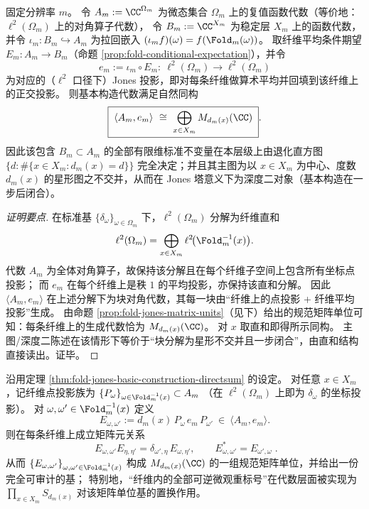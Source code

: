 \begin{theorem}\label{thm:fold-jones-basic-construction-directsum}
固定分辨率 \(m\)。
令
\(
A_m:=\CC^{\Omega_m}
\)
为微态集合 \(\Omega_m\) 上的复值函数代数（等价地：\(\ell^2(\Omega_m)\) 上的对角算子代数），
令
\(
B_m:=\CC^{X_m}
\)
为稳定层 \(X_m\) 上的函数代数，并令 \(\iota_m:B_m\hookrightarrow A_m\) 为拉回嵌入 \((\iota_m f)(\omega)=f(\Fold_m(\omega))\)。
取纤维平均条件期望 \(E_m:A_m\to B_m\)（命题 \ref{prop:fold-conditional-expectation}），并令
\[
e_m:=\iota_m\circ E_m:\ \ell^2(\Omega_m)\to \ell^2(\Omega_m)
\]
为对应的（\(\ell^2\) 口径下）Jones 投影，即对每条纤维做算术平均并回填到该纤维上的正交投影。
则基本构造代数满足自然同构
\[
\boxed{\;
\langle A_m,e_m\rangle
\ \cong\
\bigoplus_{x\in X_m} M_{d_m(x)}(\CC)\; }.
\]
因此该包含 \(B_m\subset A_m\) 的全部有限维标准不变量在本层级上由退化直方图
\(
\{d:\#\{x\in X_m:d_m(x)=d\}\}
\)
完全决定；并且其主图为以 \(x\in X_m\) 为中心、度数 \(d_m(x)\) 的星形图之不交并，从而在 Jones 塔意义下为深度二对象（基本构造在一步后闭合）。
\end{theorem}

\begin{proof}[证明要点]
在标准基 \(\{\delta_\omega\}_{\omega\in\Omega_m}\) 下，\(\ell^2(\Omega_m)\) 分解为纤维直和
\[
\ell^2(\Omega_m)=\bigoplus_{x\in X_m}\ell^2\!\bigl(\Fold_m^{-1}(x)\bigr).
\]
代数 \(A_m\) 为全体对角算子，故保持该分解且在每个纤维子空间上包含所有坐标点投影；
而 \(e_m\) 在每个纤维上是秩 \(1\) 的平均投影，亦保持该直和分解。
因此 \(\langle A_m,e_m\rangle\) 在上述分解下为块对角代数，其每一块由“纤维上的点投影 + 纤维平均投影”生成。
由命题 \ref{prop:fold-jones-matrix-units}（见下）给出的规范矩阵单位可知：每条纤维上的生成代数恰为 \(M_{d_m(x)}(\CC)\)。
对 \(x\) 取直和即得所示同构。
主图/深度二陈述在该情形下等价于“块分解为星形不交并且一步闭合”，由直和结构直接读出。证毕。
\end{proof}

\begin{proposition}\label{prop:fold-jones-matrix-units}
\leanverified{paper\_fold\_jones\_matrix\_units}
沿用定理 \ref{thm:fold-jones-basic-construction-directsum} 的设定。
对任意 \(x\in X_m\)，记纤维点投影族为
\(
\{P_\omega\}_{\omega\in \Fold_m^{-1}(x)}\subset A_m
\)
（在 \(\ell^2(\Omega_m)\) 上即为 \(\delta_\omega\) 的坐标投影）。
对 \(\omega,\omega'\in \Fold_m^{-1}(x)\) 定义
\[
E_{\omega,\omega'}:=d_m(x)\,P_\omega\,e_m\,P_{\omega'}\ \in\ \langle A_m,e_m\rangle.
\]
则在每条纤维上成立矩阵元关系
\[
\boxed{\;
E_{\omega,\omega'}E_{\eta,\eta'}=\delta_{\omega',\eta}\,E_{\omega,\eta'},
\qquad
E_{\omega,\omega'}^{\ast}=E_{\omega',\omega}\; }.
\]
从而 \(\{E_{\omega,\omega'}\}_{\omega,\omega'\in\Fold_m^{-1}(x)}\) 构成 \(M_{d_m(x)}(\CC)\) 的一组规范矩阵单位，并给出一份完全可审计的基；
特别地，“纤维内的全部可逆微观重标号”在代数层面被实现为
\(
\prod_{x\in X_m}S_{d_m(x)}
\)
对该矩阵单位基的置换作用。
\end{proposition}

